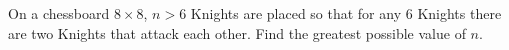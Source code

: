 On a chessboard $8\times 8$, $n>6$ Knights are placed so that for any 6 Knights there are two Knights that attack each other. Find the greatest possible value of $n$.